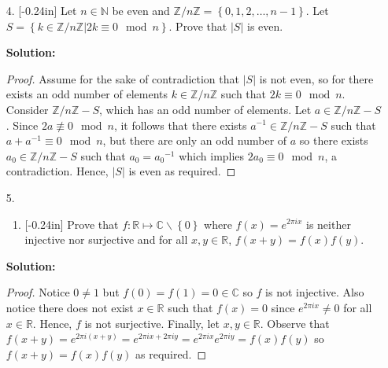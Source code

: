 \documentclass[letterpaper,12pt]{article}
\newcommand{\set}[1]{\left\{ #1 \right\}}
\theoremstyle{definition}
\begin{document}
\pagebreak
\begin{enumerate}
    \item[4.]\reversemarginpar{}[-0.24in] Let $n \in \mathbb{N}$ be even and $\mathbb{Z} / n\mathbb{Z} = \set{0,1,2,\ldots,n-1}$. Let $S = \set{k \in \mathbb{Z} / n\mathbb{Z}  | 2k \equiv 0 \mod n }$. Prove that $|S|$ is even.
     \begin{mdframed}
            \textbf{Solution:}
            \begin{proof}
                Assume for the sake of contradiction that $|S|$ is not even, so for there exists an odd number of elements $k \in \mathbb{Z}/n\mathbb{Z}$ such that $2k \equiv 0 \mod n$. Consider $\mathbb{Z} / n\mathbb{Z}-S$, which has an odd number of elements. Let $a \in \mathbb{Z} / n\mathbb{Z}-S$. Since $2a \not \equiv 0 \mod n$, it follows that there exists $a^{-1} \in \mathbb{Z} / n\mathbb{Z}-S$ such that $a + a^{-1} \equiv 0 \mod n$, but there are only an odd number of $a$ so there exists $a_0 \in \mathbb{Z} / n\mathbb{Z}-S $ such that $a_0 = {a_0}^{-1}$ which implies $2a_0 \equiv 0 \mod n$, a contradiction. Hence, $|S|$ is even as required.
            \end{proof}
        \end{mdframed}
\end{enumerate}
\pagebreak
\begin{enumerate}
    \item[5.] \begin{enumerate} \item \reversemarginpar{}[-0.24in] Prove that $f: \mathbb{R} \mapsto \mathbb{C}\backslash \set{0}$ where $f(x) = e^{2\pi i x}$ is neither injective nor surjective and for all $x,y \in \mathbb{R}$, $f(x+y) = f(x)f(y)$. \end{enumerate}
     \begin{mdframed}
            \textbf{Solution:}
            \begin{proof}
                Notice $0 \neq 1$ but $f(0) = f(1) = 0 \in \mathbb{C}$ so $f$ is not injective. Also notice there does not exist $x \in \mathbb{R}$ such that $f(x) = 0$ since $e^{2\pi i x} \neq 0$ for all $x \in \mathbb{R}$. Hence, $f$ is not surjective. Finally, let $x,y \in \mathbb{R}$. Observe that $f(x+y) = e^{2\pi i (x+y)} = e^{2\pi i x + 2\pi i y} = e^{2\pi i x} e^{2\pi i y} = f(x)f(y)$ so $f(x+y) = f(x)f(y)$ as required.
            \end{proof}
        \end{mdframed}
\end{enumerate}
\end{document}
